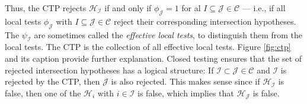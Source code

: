 \documentclass[11pt]{article}
\theoremstyle{plain}
\theoremstyle{definition}
\newcommand{\I}{\mathcal{I}}
\newcommand{\J}{\mathcal{J}}
\newcommand{\Hy}{\mathcal{H}}
\newcommand{\subs}{\mathcal{C}}
\begin{document}
 
Thus, the CTP rejects $\Hy_{\I}$ if and only if  $\phi_{\J}=1$ for al $I\subseteq \J\in \subs$ --- i.e., if all local tests $\phi_{\J}$ with $I\subseteq \J\in \subs$ reject their corresponding intersection hypotheses. 
 The $\psi_{\I}$ are sometimes called the \emph{effective local tests}, to distinguish them from the local tests. The CTP is  the collection of all  effective local tests.  Figure \ref{fig:ctp} and its caption provide further explanation.
Closed testing ensures that the set of rejected intersection hypotheses has  a logical structure: If  $\I\subset \J\in\subs$ and $\I$ is rejected by the CTP, then $\J$ is also rejected. This makes sense since if $\Hy_{\I}$ is false, then one of the $\Hy_i$ with $i\in \I$ is false, which implies that $\Hy_{\J}$ is false. 


\end{document}
